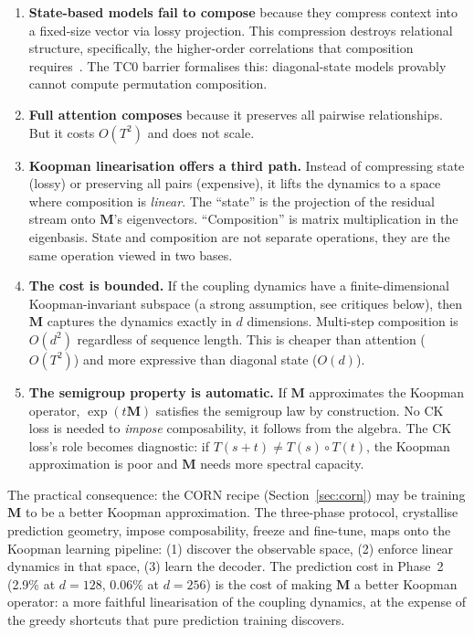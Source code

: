 \documentclass[11pt, a4paper]{article}
\newcommand{\M}{\mathbf{M}}
\theoremstyle{plain}
\theoremstyle{remark}
\begin{document}
\begin{enumerate}
    \item \textbf{State-based models fail to compose} because they compress context into a fixed-size vector via lossy projection.
    This compression destroys relational structure, specifically, the higher-order correlations that composition requires~\cite{merrill2024illusion, sanford2025provable}.
    The TC0 barrier formalises this: diagonal-state models provably cannot compute permutation composition.

    \item \textbf{Full attention composes} because it preserves all pairwise relationships.
    But it costs $O(T^2)$ and does not scale.

    \item \textbf{Koopman linearisation offers a third path.}
    Instead of compressing state (lossy) or preserving all pairs (expensive), it lifts the dynamics to a space where composition is \emph{linear}.
    The ``state'' is the projection of the residual stream onto $\M$'s eigenvectors.
    ``Composition'' is matrix multiplication in the eigenbasis.
    State and composition are not separate operations, they are the same operation viewed in two bases.

    \item \textbf{The cost is bounded.}
    If the coupling dynamics have a finite-dimensional Koopman-invariant subspace (a strong assumption, see critiques below), then $\M$ captures the dynamics exactly in $d$ dimensions.
    Multi-step composition is $O(d^2)$ regardless of sequence length.
    This is cheaper than attention ($O(T^2)$) and more expressive than diagonal state ($O(d)$).

    \item \textbf{The semigroup property is automatic.}
    If $\M$ approximates the Koopman operator, $\exp(t\M)$ satisfies the semigroup law by construction.
    No CK loss is needed to \emph{impose} composability, it follows from the algebra.
    The CK loss's role becomes diagnostic: if $T(s{+}t) \neq T(s) \circ T(t)$, the Koopman approximation is poor and $\M$ needs more spectral capacity.
\end{enumerate}

The practical consequence: the CORN recipe (Section~\ref{sec:corn}) may be training $\M$ to be a better Koopman approximation.
The three-phase protocol, crystallise prediction geometry, impose composability, freeze and fine-tune, maps onto the Koopman learning pipeline: (1) discover the observable space, (2) enforce linear dynamics in that space, (3) learn the decoder.
The prediction cost in Phase~2 (2.9\% at $d{=}128$, $0.06\%$ at $d{=}256$) is the cost of making $\M$ a better Koopman operator: a more faithful linearisation of the coupling dynamics, at the expense of the greedy shortcuts that pure prediction training discovers.
\end{document}
